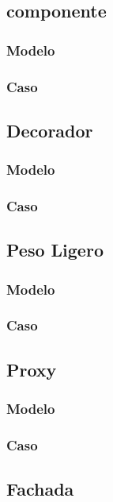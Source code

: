 \subsection{componente}
\subsubsection{Modelo}
\newpage
\subsubsection{Caso}
\newpage

\subsection{Decorador}
\subsubsection{Modelo}
\newpage
\subsubsection{Caso}
\newpage

\subsection{Peso Ligero}
\subsubsection{Modelo}
\newpage
\subsubsection{Caso}
\newpage

\subsection{Proxy}
\subsubsection{Modelo}
\newpage
\subsubsection{Caso}
\newpage

\subsection{Fachada}
